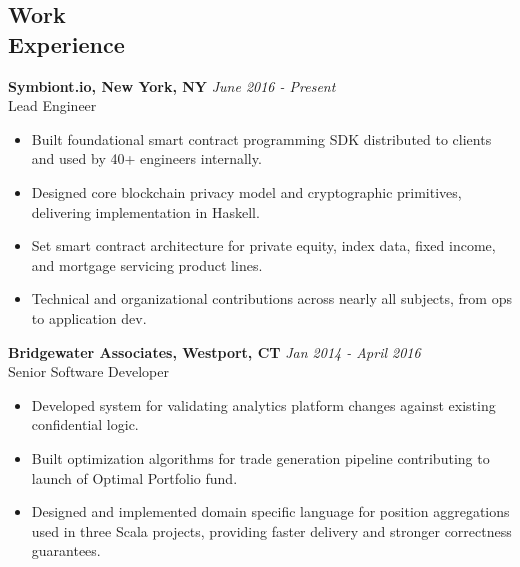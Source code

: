 \documentclass[margin]{res}
\begin{document}
 
 

\address{{\bf Contact} \\ jobs@aarontodd.name \\ (415) 847-0997 }

\address{{\bf Address} \\ 70 Pine St. Apt 928 \\ New York, NY 10005 }


\begin{resume} 
  
\section{Work \\ Experience}

{\bf Symbiont.io, New York, NY} \hfill \textit{June 2016 - Present} \\
Lead Engineer
\begin{itemize} 	\itemsep -2pt
\item Built foundational smart contract programming SDK distributed to clients and used by 40+ engineers internally.
\item Designed core blockchain privacy model and cryptographic primitives, delivering implementation in Haskell.
\item Set smart contract architecture for private equity, index data, fixed income, and mortgage servicing product lines.
\item Technical and organizational contributions across nearly all subjects, from ops to application dev.
\end{itemize}

 {\bf Bridgewater Associates, Westport, CT} \hfill \textit{Jan 2014 - April 2016} \\
 Senior Software Developer
 \begin{itemize} \itemsep -2pt  %
 \item Developed system for validating analytics platform changes against existing confidential logic.
 \item Built optimization algorithms for trade generation pipeline contributing to launch of Optimal Portfolio fund.
 \item Designed and implemented domain specific language for position aggregations used in three Scala projects, providing faster delivery and stronger correctness guarantees.
 \end{itemize}


\end{resume}
\end{document}
